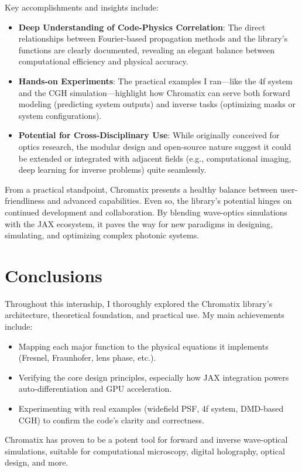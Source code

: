 \documentclass[a4paper,12pt]{report}
\begin{document}
Key accomplishments and insights include:
\begin{itemize}
    \item \textbf{Deep Understanding of Code-Physics Correlation}: The direct relationships between Fourier-based propagation methods and the library’s functions are clearly documented, revealing an elegant balance between computational efficiency and physical accuracy.
    \item \textbf{Hands-on Experiments}: The practical examples I ran—like the 4f system and the CGH simulation—highlight how Chromatix can serve both forward modeling (predicting system outputs) and inverse tasks (optimizing masks or system configurations).
    \item \textbf{Potential for Cross-Disciplinary Use}: While originally conceived for optics research, the modular design and open-source nature suggest it could be extended or integrated with adjacent fields (e.g., computational imaging, deep learning for inverse problems) quite seamlessly.
\end{itemize}

From a practical standpoint, Chromatix presents a healthy balance between user-friendliness and advanced capabilities. Even so, the library’s potential hinges on continued development and collaboration. By blending wave-optics simulations with the JAX ecosystem, it paves the way for new paradigms in designing, simulating, and optimizing complex photonic systems.


\section{Conclusions}
Throughout this internship, I thoroughly explored the Chromatix library’s architecture, theoretical foundation, and practical use. My main achievements include:
\begin{itemize}
    \item Mapping each major function to the physical equations it implements (Fresnel, Fraunhofer, lens phase, etc.).
    \item Verifying the core design principles, especially how JAX integration powers auto-differentiation and GPU acceleration.
    \item Experimenting with real examples (widefield PSF, 4f system, DMD-based CGH) to confirm the code's clarity and correctness.
\end{itemize}
Chromatix has proven to be a potent tool for forward and inverse wave-optical simulations, suitable for computational microscopy, digital holography, optical design, and more.
\end{document}
